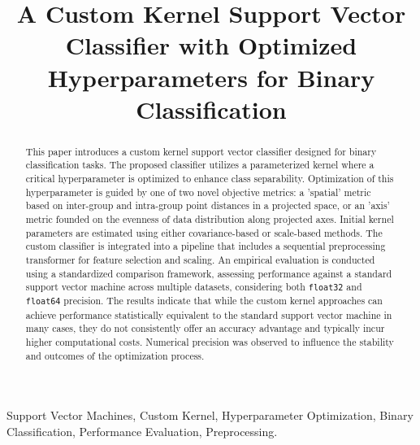 \documentclass[conference]{IEEEtran}
\begin{document}
\title{A Custom Kernel Support Vector Classifier with Optimized Hyperparameters for Binary Classification}

\author{
}

\maketitle

\begin{abstract}
This paper introduces a custom kernel support vector classifier designed for binary classification tasks. The proposed classifier utilizes a parameterized kernel where a critical hyperparameter is optimized to enhance class separability. Optimization of this hyperparameter is guided by one of two novel objective metrics: a 'spatial' metric based on inter-group and intra-group point distances in a projected space, or an 'axis' metric founded on the evenness of data distribution along projected axes. Initial kernel parameters are estimated using either covariance-based or scale-based methods. The custom classifier is integrated into a pipeline that includes a sequential preprocessing transformer for feature selection and scaling. An empirical evaluation is conducted using a standardized comparison framework, assessing performance against a standard support vector machine across multiple datasets, considering both \texttt{float32} and \texttt{float64} precision. The results indicate that while the custom kernel approaches can achieve performance statistically equivalent to the standard support vector machine in many cases, they do not consistently offer an accuracy advantage and typically incur higher computational costs. Numerical precision was observed to influence the stability and outcomes of the optimization process.
\end{abstract}

\begin{IEEEkeywords}
Support Vector Machines, Custom Kernel, Hyperparameter Optimization, Binary Classification, Performance Evaluation, Preprocessing.
\end{IEEEkeywords}
\end{document}
